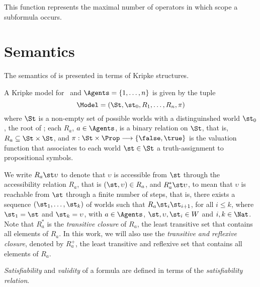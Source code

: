 This function represents the maximal number of operators in which scope a
subformula occurs.

\section{Semantics}%
\label{semantics}

The semantics of  is presented in terms of Kripke structures.

\begin{definition}%
\label{def:semantics}
    A Kripke model for \Prop~and $\Agents = \{1, \ldots, n\}$ is given by the tuple 
    \begin{equation}
        \Model = (\St, \st_0, R_1, \ldots, R_n, \pi)
    \end{equation}
    where $\St$ is a non-empty set of possible worlds with a distinguinshed world
    $\st_0$, the root of \Model; each $R_a$, $a \in \Agents$, is a binary relation
    on $\St$, that is, $R_a \subseteq \St \times \St$, and $\pi: \St \times \Prop
    \longrightarrow \{\false, \true\}$ is the valuation function that associates
    to each world $\st \in \St$ a truth-assignment to propositional symbols.
\end{definition}

We write $R_a \st \upsilon$ to denote that $\upsilon$ is accessible from $\st$
through the accessibility relation $R_a$, that is $(\st, \upsilon) \in R_a$, and
$R^*_a \st \upsilon$, to mean that $\upsilon$ is reachable from $\st$ through a
finite number of steps, that is, there exists a sequence $(\st_1, \ldots,
\st_k)$ of worlds such that $R_a \st_i \st_{i+1}$, for all $i \leq k$, where
$\st_1 = \st$ and $\st_k = \upsilon$, with $a \in \Agents$, $\st, \upsilon,
\st_i \in W$ and $i, k \in \Nat$. Note that $R_a^*$ is the \emph{transitive
closure} of $R_a$, the least transitive set that contains all elements of $R_a$.
In this work, we will also use the \emph{transitive and reflexive closure},
denoted by $R_a^+$, the least transitive and reflexive set that contains all
elements of $R_a$.

\emph{Satisfiability} and \emph{validity} of a formula are defined in terms of
the \emph{satisfiability relation}.

